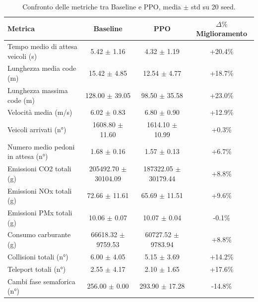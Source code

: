 \begin{table}[ht]
\centering
\caption{Confronto delle metriche tra Baseline e PPO, media $\pm$ std su 20 seed.}
\label{tab:final_comparison}
\begin{tabular}{lccc}
\toprule
\textbf{Metrica} & \textbf{Baseline} & \textbf{PPO} & \textbf{$\Delta\%$ Miglioramento} \\
\midrule
Tempo medio di attesa veicoli (s) & 5.42 $\pm$ 1.16 & 4.32 $\pm$ 1.19 & +20.4\% \\
Lunghezza media code (m) & 15.42 $\pm$ 4.85 & 12.54 $\pm$ 4.77 & +18.7\% \\
Lunghezza massima code (m) & 128.00 $\pm$ 39.05 & 98.50 $\pm$ 35.58 & +23.0\% \\
Velocità media (m/s) & 6.02 $\pm$ 0.83 & 6.80 $\pm$ 0.90 & +12.9\% \\
Veicoli arrivati (n°) & 1608.80 $\pm$ 11.60 & 1614.10 $\pm$ 10.99 & +0.3\% \\
Numero medio pedoni in attesa (n°) & 1.68 $\pm$ 0.16 & 1.57 $\pm$ 0.13 & +6.7\% \\
Emissioni CO2 totali (g) & 205492.70 $\pm$ 30104.09 & 187322.05 $\pm$ 30179.44 & +8.8\% \\
Emissioni NOx totali (g) & 72.66 $\pm$ 11.61 & 65.69 $\pm$ 11.51 & +9.6\% \\
Emissioni PMx totali (g) & 10.06 $\pm$ 0.07 & 10.07 $\pm$ 0.04 & -0.1\% \\
Consumo carburante (g) & 66618.32 $\pm$ 9759.53 & 60727.52 $\pm$ 9783.94 & +8.8\% \\
Collisioni totali (n°) & 6.00 $\pm$ 4.05 & 5.15 $\pm$ 3.69 & +14.2\% \\
Teleport totali (n°) & 2.55 $\pm$ 4.17 & 2.10 $\pm$ 1.65 & +17.6\% \\
Cambi fase semaforica (n°) & 256.00 $\pm$ 0.00 & 293.90 $\pm$ 17.28 & -14.8\% \\
\bottomrule
\end{tabular}
\end{table}